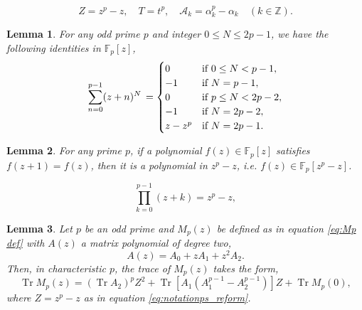 \documentclass[10pt,a4paper]{amsart}
\newtheorem{lemma}{Lemma}
\begin{document}
\begin{equation}\label{eq:notationps_reform}
 Z=z^p-z,\quad  T=t^p,\quad \mathcal{A}_k=\alpha_k^p-\alpha_k\quad (k\in\mathbb{Z}).
\end{equation}

\begin{lemma}\label{lemma:z+n}
For any odd prime $p$ and integer $0\leq N\leq 2p-1$, we have the following identities in  $\mathbb{F}_p[z]$,
\begin{equation}\label{eq:sumidentity}
\sum_{n=0}^{p-1}(z+n)^N\, = \begin{cases}
0 &\text{if $0\leq N < p-1$},\\
-1 &\text{if $N=p-1 $},\\
0 &\text{if $p\leq N < 2p-2 $},\\
-1 &\text{if $ N = 2p-2 $},\\
z-z^p &\text{if $N=2p-1 $}.
\end{cases}
\end{equation}
\end{lemma}

\begin{lemma}\label{lem:invpol} For any prime $p$,
    if a polynomial $f(z)\in \mathbb{F}_p[z]$ satisfies $f(z+1)=f(z)$, then it is a polynomial in $z^p-z$, i.e. $f(z)\in\mathbb{F}_p[z^p-z]$.
\end{lemma}

    \begin{equation}\label{eq:polyproduct}
        \prod_{k=0}^{p-1} (z+k) = z^p - z,
    \end{equation}

\begin{lemma}\label{lem:trace}
Let $p$ be an odd prime and $M_p(z)$ be defined as in equation \eqref{eq:Mp def} with $A(z)$ a matrix polynomial of degree two,
\[ A(z) =A_0+z A_1+z^2 A_2 .\]
Then, in characteristic $p$, the trace of $M_p(z)$ takes the form,
    \begin{equation}\label{eq:trace with Ak}
    \operatorname{Tr}M_p(z) =  (\operatorname{Tr}A_2)^pZ^2+
        \operatorname{Tr}[A_1(A_1^{p-1}-A_2^{p-1})]Z+\operatorname{Tr}M_p(0),
\end{equation}
where $ Z=z^p-z$ as in equation \eqref{eq:notationps_reform}.
\end{lemma}
\end{document}
